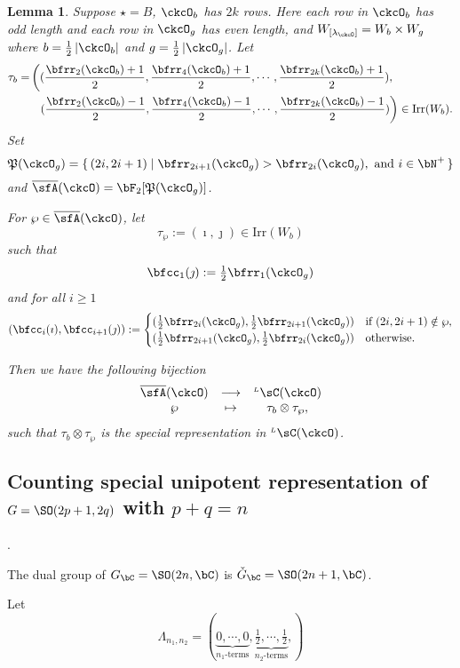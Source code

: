 \documentclass[12pt,a4paper]{amsart}
\def\abs#1{\left|{#1}\right|}
\newcommand{\CQ}{{\mathcal {Q}}}
\numberwithin{equation}{section}
\newtheorem{lem}[thm]{Lemma}
\theoremstyle{remark}
\def\half{{\tfrac{1}{2}}}
\def\Irr{\mathrm{Irr}}
\def\ckGc{\check{G}_{\bC}}
\def\Gc{G_\bC}
\def\WLamck{W_{[\lambda_{\ckcO}]}}
\def\LC{{}^{\scriptscriptstyle L}\sC}
\def\CQ{\overline{\sfA}}%
\def\CPP{\mathfrak{P}}
\begin{document}
\begin{lem}
  Suppose $\star = B$, $\ckcO_{b}$ has $2k$ rows. Here each row in $\ckcO_{b}$ has
  odd length and each row in $\ckcO_{g}$ has even length, and
  $\WLamck = W_{b}\times W_{g}$ where $b=\half \abs{\ckcO_{b}}$ and
  $g = \half\abs{\ckcO_{g}}$.
  Let
  \[
    \begin{split}
      \tau_{b} =  & \left( (\frac{\bfrr_{2}(\ckcO_{b})+1}{2}, \frac{\bfrr_{4}(\ckcO_{b})+1}{2}, \cdots, \frac{\bfrr_{2k}(\ckcO_{b})+1}{2}),\right.\\
        &\ \ \left. (\frac{\bfrr_{2}(\ckcO_{b})-1}{2}, \frac{\bfrr_{4}(\ckcO_{b})-1}{2}, \cdots, \frac{\bfrr_{2k}(\ckcO_{b})-1}{2})\right) \in \Irr(W_{b}).
    \end{split}
  \]
  Set
  \[
    \CPP(\ckcO_{g}) = \set{(2i,2i+1)| \bfrr_{2i+1}(\ckcO_{g})> \bfrr_{2i}(\ckcO_{g}), \text{
        and } i\in \bN^{+}}
  \]
  and $\CQ(\ckcO)= \bF_{2}[\CPP(\ckcO_{g})]$.

  For $\wp \in \CQ(\ckcO)$, let
  \[
    \tau_{\wp} := (\imath,\jmath) \in \Irr(W_{b})
  \]
  such that
  \[
    \bfcc_{1}(\jmath)  := \half\bfrr_{1}(\ckcO_{g})
  \]
  and for all $i\geq 1$
  \[
  (\bfcc_{i}(\imath), \bfcc_{i+1}(\jmath)):=
  \begin{cases}
    (\half \bfrr_{2i}(\ckcO_{g}), \half \bfrr_{2i+1}(\ckcO_{g}))
    & \text{if } (2i,2i+1)\notin \wp,\\
    (\half \bfrr_{2i+1}(\ckcO_{g}),\half \bfrr_{2i}(\ckcO_{g})) & \text{otherwise.}
  \end{cases}
  \]

  Then we have the following bijection
  \[
    \begin{array}{ccc}
      \CQ(\ckcO) &\longrightarrow & \LC(\ckcO)\\
      \wp & \mapsto & \tau_{b}\otimes \tau_{\wp},
    \end{array}
  \]
  such that $\tau_{b}\otimes \tau_{\wp}$ is the special representation in
  $\LC(\ckcO)$.
\end{lem}


\subsection{Counting special unipotent representation of $G=\SO(2p+1,2q)$ with
$p+q=n$}.

The dual group of $\Gc = \SO(2n,\bC)$ is $\ckGc = \SO(2n+1,\bC)$.

Let \[
  \Lambda_{n_{1}, n_{2}} = (\underbrace{0,\cdots,0}_{n_{1}\text{-terms}}, \underbrace{\half,\cdots,\half}_{n_{2}\text{-terms}}, )
\]
\end{document}
